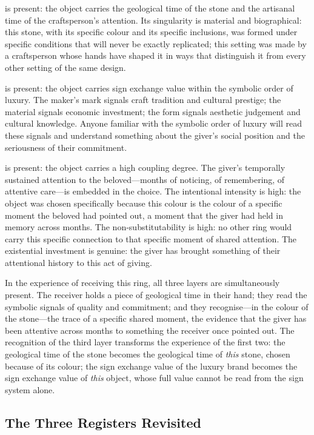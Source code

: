  is present: the object carries the geological time of the stone and the artisanal time of the craftsperson's attention. Its singularity is material and biographical: this stone, with its specific colour and its specific inclusions, was formed under specific conditions that will never be exactly replicated; this setting was made by a craftsperson whose hands have shaped it in ways that distinguish it from every other setting of the same design.

 is present: the object carries sign exchange value within the symbolic order of luxury. The maker's mark signals craft tradition and cultural prestige; the material signals economic investment; the form signals aesthetic judgement and cultural knowledge. Anyone familiar with the symbolic order of luxury will read these signals and understand something about the giver's social position and the seriousness of their commitment.

 is present: the object carries a high coupling degree. The giver's temporally sustained attention to the beloved---months of noticing, of remembering, of attentive care---is embedded in the choice. The intentional intensity is high: the object was chosen specifically because this colour is the colour of a specific moment the beloved had pointed out, a moment that the giver had held in memory across months. The non-substitutability is high: no other ring would carry this specific connection to that specific moment of shared attention. The existential investment is genuine: the giver has brought something of their attentional history to this act of giving.

In the experience of receiving this ring, all three layers are simultaneously present. The receiver holds a piece of geological time in their hand; they read the symbolic signals of quality and commitment; and they recognise---in the colour of the stone---the trace of a specific shared moment, the evidence that the giver has been attentive across months to something the receiver once pointed out. The recognition of the third layer transforms the experience of the first two: the geological time of the stone becomes the geological time of \emph{this} stone, chosen because of its colour; the sign exchange value of the luxury brand becomes the sign exchange value of \emph{this} object, whose full value cannot be read from the sign system alone.

\subsection{The Three Registers Revisited}
\label{p16:subsec:three_registers}

